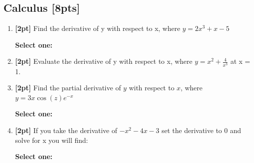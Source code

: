 \documentclass[12pt]{article}
\renewcommand{\circle}{\tikz\draw[black] (0,0) circle (1ex);}
\begin{document}
\subsection{Calculus [8pts]}
\begin{enumerate}
    \item \textbf{[2pt]} Find the derivative of y with respect to x, where $y=2x^3+x-5$

    \textbf{Select one:}


    \item \textbf{[2pt]} Evaluate the derivative of y with respect to x, where $y = x^2 + \frac{4}{x^3}$ at x = 1.

    \begin{tcolorbox}[fit,height=1cm, width=2cm, blank, borderline={1pt}{-2pt},nobeforeafter]
    \end{tcolorbox}


    \item \textbf{[2pt]} Find the partial derivative of $y$ with respect to $x$, where $y= 3x \cos(z) e^{-x}$

    \textbf{Select one:}


    \item \textbf{[2pt]} If you take the derivative of $-x^2 - 4x - 3$ set the derivative to 0 and solve for x you will find:

    \textbf{Select one:}


    \clearpage
\end{enumerate}
\end{document}
